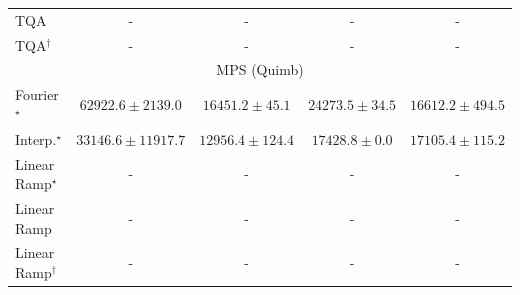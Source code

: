 \begin{tabular}{l|cccc|}
TQA & {\cellcolor[HTML]{000000}} \color[HTML]{F1F1F1} {\cellcolor{white}} \color{black} - & {\cellcolor[HTML]{000000}} \color[HTML]{F1F1F1} {\cellcolor{white}} \color{black} - & {\cellcolor[HTML]{000000}} \color[HTML]{F1F1F1} {\cellcolor{white}} \color{black} - & {\cellcolor[HTML]{000000}} \color[HTML]{F1F1F1} {\cellcolor{white}} \color{black} - \\
TQA$^\dagger$ & {\cellcolor[HTML]{000000}} \color[HTML]{F1F1F1} {\cellcolor{white}} \color{black} - & {\cellcolor[HTML]{000000}} \color[HTML]{F1F1F1} {\cellcolor{white}} \color{black} - & {\cellcolor[HTML]{000000}} \color[HTML]{F1F1F1} {\cellcolor{white}} \color{black} - & {\cellcolor[HTML]{000000}} \color[HTML]{F1F1F1} {\cellcolor{white}} \color{black} - \\
\cline{1-5}
\multicolumn{5}{c}{\rule{0pt}{8pt}MPS (Quimb)} \\
\midrule
Fourier$^\star$ & {\cellcolor[HTML]{9E3604}} \color[HTML]{F1F1F1} $62922.6\pm 2139.0$ & {\cellcolor[HTML]{FFFBD2}} \color[HTML]{000000} $16451.2\pm 45.1$ & {\cellcolor[HTML]{FEECA4}} \color[HTML]{000000} $24273.5\pm 34.5$ & {\cellcolor[HTML]{FFFBD0}} \color[HTML]{000000} $16612.2\pm 494.5$ \\
Interp.$^\star$ & {\cellcolor[HTML]{FECA5D}} \color[HTML]{000000} $33146.6\pm 11917.7$ & {\cellcolor[HTML]{FFFFE5}} \color[HTML]{000000} $12956.4\pm 124.4$ & {\cellcolor[HTML]{FFFACD}} \color[HTML]{000000} $17428.8\pm 0.0$ & {\cellcolor[HTML]{FFFACE}} \color[HTML]{000000} $17105.4\pm 115.2$ \\
Linear Ramp$^\star$ & {\cellcolor[HTML]{000000}} \color[HTML]{F1F1F1} {\cellcolor{white}} \color{black} - & {\cellcolor[HTML]{000000}} \color[HTML]{F1F1F1} {\cellcolor{white}} \color{black} - & {\cellcolor[HTML]{000000}} \color[HTML]{F1F1F1} {\cellcolor{white}} \color{black} - & {\cellcolor[HTML]{000000}} \color[HTML]{F1F1F1} {\cellcolor{white}} \color{black} - \\
Linear Ramp & {\cellcolor[HTML]{000000}} \color[HTML]{F1F1F1} {\cellcolor{white}} \color{black} - & {\cellcolor[HTML]{000000}} \color[HTML]{F1F1F1} {\cellcolor{white}} \color{black} - & {\cellcolor[HTML]{000000}} \color[HTML]{F1F1F1} {\cellcolor{white}} \color{black} - & {\cellcolor[HTML]{000000}} \color[HTML]{F1F1F1} {\cellcolor{white}} \color{black} - \\
Linear Ramp$^\dagger$ & {\cellcolor[HTML]{000000}} \color[HTML]{F1F1F1} {\cellcolor{white}} \color{black} - & {\cellcolor[HTML]{000000}} \color[HTML]{F1F1F1} {\cellcolor{white}} \color{black} - & {\cellcolor[HTML]{000000}} \color[HTML]{F1F1F1} {\cellcolor{white}} \color{black} - & {\cellcolor[HTML]{000000}} \color[HTML]{F1F1F1} {\cellcolor{white}} \color{black} - \\

\end{tabular}
